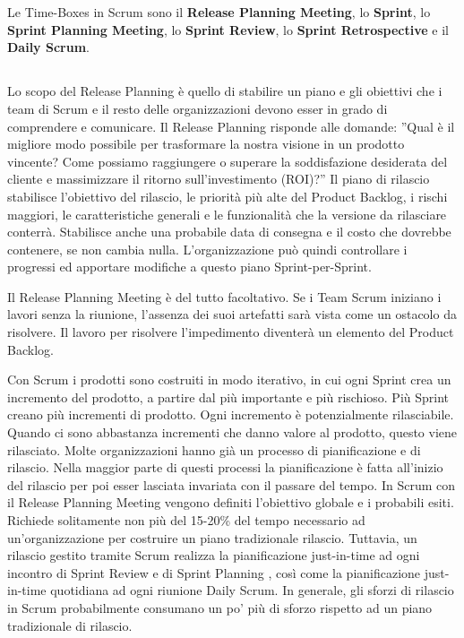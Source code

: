 \section*{\color{Blue}{TIME-BOXES}}
\label{sec:timeboxes}
Le Time-Boxes in Scrum sono il \textbf{Release Planning Meeting}, lo \textbf{Sprint}, lo \textbf{Sprint Planning Meeting}, lo \textbf{Sprint Review}, lo
\textbf{Sprint Retrospective} e il \textbf{Daily Scrum}.

\subsection*{\color{Blue}{RELEASE PLANNING MEETING}}
\label{sec:releaseplanningmeeting}
Lo scopo del Release Planning \`e quello di stabilire un piano e gli obiettivi che i team di Scrum e il resto delle
organizzazioni devono esser in grado di comprendere e comunicare. Il Release Planning  risponde alle domande: ''Qual \`e
il migliore modo possibile per trasformare la nostra visione in un prodotto vincente? Come possiamo raggiungere o superare la
soddisfazione desiderata del cliente e massimizzare il ritorno sull'investimento (ROI)?'' Il piano di rilascio stabilisce l'obiettivo
del rilascio, le priorit\`a pi\`u alte del Product Backlog, i rischi maggiori, le caratteristiche generali e le
funzionalit\`a che la versione da rilasciare conterr\`a. Stabilisce anche una probabile data di consegna e il costo che
dovrebbe contenere, se non cambia nulla. L'organizzazione pu\`o quindi controllare i progressi ed apportare modifiche a
questo piano Sprint-per-Sprint.
\newline

Il Release Planning Meeting \`e del tutto facoltativo. Se i Team Scrum iniziano i lavori senza la riunione,
l'assenza dei suoi artefatti sar\`a vista come un ostacolo da risolvere. Il lavoro per risolvere l'impedimento
diventer\`a un elemento del Product Backlog.
\newline

Con Scrum i prodotti sono costruiti in modo iterativo, in cui ogni Sprint crea un incremento del prodotto, a partire
dal pi\`u importante e pi\`u rischioso. Pi\`u Sprint creano pi\`u incrementi di prodotto. Ogni incremento \`e
potenzialmente rilasciabile. Quando ci sono abbastanza incrementi che danno valore al prodotto, questo viene
rilasciato. Molte organizzazioni hanno gi\`a un processo di pianificazione e di rilascio. Nella maggior parte di questi
processi la pianificazione \`e fatta all'inizio del rilascio per poi esser lasciata invariata con il passare del tempo.
In Scrum con il Release Planning Meeting vengono definiti l'obiettivo globale e i probabili esiti. Richiede solitamente non
pi\`u del 15-20\% del tempo necessario ad un'organizzazione per costruire un piano tradizionale rilascio. Tuttavia, un
rilascio gestito tramite Scrum realizza la pianificazione just-in-time ad ogni incontro di Sprint Review e di Sprint Planning ,
cos\`i come la pianificazione just-in-time quotidiana ad ogni riunione Daily Scrum. In generale, gli sforzi di rilascio
in Scrum probabilmente consumano un po' pi\`u di sforzo rispetto ad un piano tradizionale di rilascio.
\newline

